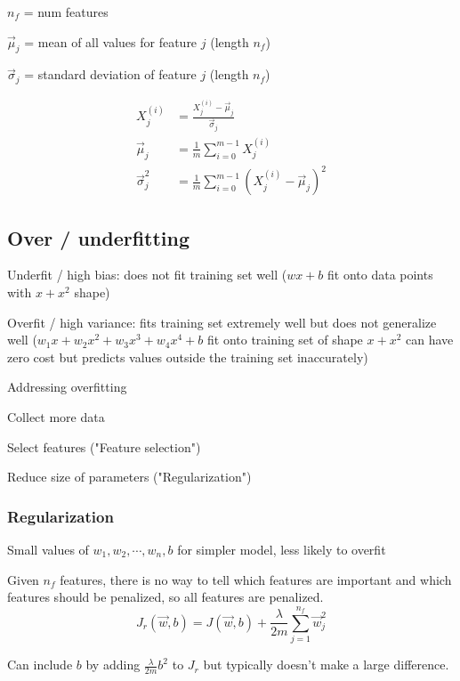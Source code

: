 \documentclass[12pt]{article}
\begin{document}
$n_f$ = num features

$\vec{\mu}_j$ = mean of all values for feature $j$ (length $n_f$)

$\vec{\sigma}_j$ = standard deviation of feature $j$ (length $n_f$)

\begin{align*}
    X_j^{(i)} &= \frac{X_j^{(i)} - \vec{\mu}_j}{\vec{\sigma}_j}\\
    \vec{\mu}_j &= \frac{1}{m} \sum_{i=0}^{m-1} X_j^{(i)}\\
    \vec{\sigma}_j^2 &= \frac{1}{m} \sum_{i=0}^{m-1} (X_j^{(i)} - \vec{\mu}_j)^2
\end{align*}

\subsection{Over / underfitting}

Underfit / high bias: does not fit training set well ($wx + b$ fit onto data points with $x + x^2$ shape)

Overfit / high variance: fits training set extremely well but does not generalize well ($w_1 x + w_2 x^2 + w_3 x^3 + w_4 x^4 + b$ fit onto training set of shape $x + x^2$ can have zero cost but predicts values outside the training set inaccurately)

\vspace{5px}

Addressing overfitting
\begin{myitemize}
	\item Collect more data
	\item Select features ("Feature selection")
	\item Reduce size of parameters ("Regularization")
\end{myitemize}

\subsubsection{Regularization}

Small values of $w_1,w_2,\cdots,w_n,b$ for simpler model, less likely to overfit

Given $n_f$ features, there is no way to tell which features are important and which features should be penalized, so all features are penalized.
\[ J_r(\vec{w},b) = J(\vec{w},b) + \frac{\lambda}{2m} \sum_{j=1}^{n_f} \vec{w}_j^2 \]

Can include $b$ by adding $\frac{\lambda}{2m} b^2$ to $J_r$ but typically doesn't make a large difference.
\end{document}

